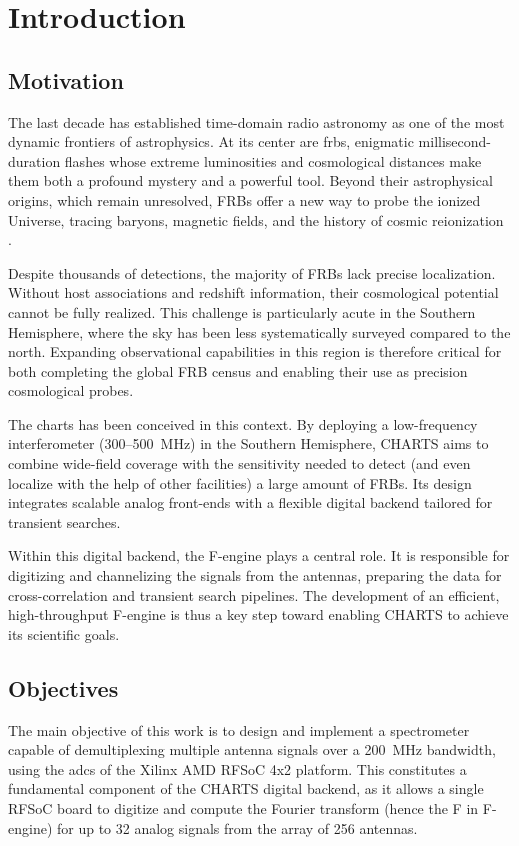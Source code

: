 \chapter{Introduction}

\section{Motivation}
The last decade has established time-domain radio astronomy as one of the most dynamic frontiers of astrophysics. At its center are \glspl{frb}, enigmatic millisecond-duration flashes whose extreme luminosities and cosmological distances make them both a profound mystery and a powerful tool. Beyond their astrophysical origins, which remain unresolved, FRBs offer a new way to probe the ionized Universe, tracing baryons, magnetic fields, and the history of cosmic reionization \citep{Macquart_2020, Zhang2023physics}.  

Despite thousands of detections, the majority of FRBs lack precise localization. Without host associations and redshift information, their cosmological potential cannot be fully realized. This challenge is particularly acute in the Southern Hemisphere, where the sky has been less systematically surveyed compared to the north. Expanding observational capabilities in this region is therefore critical for both completing the global FRB census and enabling their use as precision cosmological probes.  

The \gls{charts} has been conceived in this context. By deploying a low-frequency interferometer (300–500~MHz) in the Southern Hemisphere, CHARTS aims to combine wide-field coverage with the sensitivity needed to detect (and even localize with the help of other facilities) a large amount of FRBs. Its design integrates scalable analog front-ends with a flexible digital backend tailored for transient searches. 

Within this digital backend, the F-engine plays a central role. It is responsible for digitizing and channelizing the signals from the antennas, preparing the data for cross-correlation and transient search pipelines. The development of an efficient, high-throughput F-engine is thus a key step toward enabling CHARTS to achieve its scientific goals.

\section{Objectives}
The main objective of this work is to design and implement a spectrometer capable of demultiplexing multiple antenna signals over a \SI{200}{\mega\hertz} bandwidth, using the \glspl{adc} of the Xilinx AMD RFSoC 4x2 platform. This constitutes a fundamental component of the CHARTS digital backend, as it allows a single RFSoC board to digitize and compute the Fourier transform (hence the F in F-engine) for up to 32 analog signals from the array of 256 antennas.  

